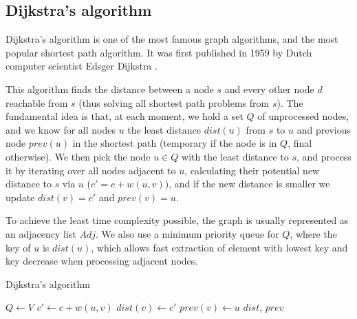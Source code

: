 \subsection{Dijkstra's algorithm} \label{algorithm-shortestpath-dijkstra}
Dijkstra's algorithm is one of the most famous graph algorithms, and the most popular shortest path algorithm. It was first published in 1959 by Dutch computer scientist Edsger Dijkstra \cite{dijkstra}.\par
This algorithm finds the distance between a node $s$ and every other node $d$ reachable from $s$ (thus solving all shortest path problems from $s$). The fundamental idea is that, at each moment, we hold a set $Q$ of unprocessed nodes, and we know for all nodes $u$ the least distance $dist(u)$ from $s$ to $u$ and previous node $prev(u)$ in the shortest path (temporary if the node is in $Q$, final otherwise). We then pick the node $u \in Q$ with the least distance to $s$, and process it by iterating over all nodes adjacent to $u$, calculating their potential new distance to $s$ via $u$ ($c'=c+w(u,v)$), and if the new distance is smaller we update $dist(v)=c'$ and $prev(v)=u$.\par
To achieve the least time complexity possible, the graph is usually represented as an adjacency list $Adj$. We also use a minimum priority queue for $Q$, where the key of $u$ is $dist(u)$, which allows fast extraction of element with lowest key and key decrease when processing adjacent nodes.
\begin{algorithm}[H]
    \caption{Dijkstra's algorithm}
    \label{alg-dijkstra}
    \begin{algorithmic}[1]
             
            \EndFor
            \State $Q \gets V$
             
                    \State $c' \gets c + w(u, v)$
                        \State $dist(v) \gets c'$
                        \State $prev(v) \gets u$
                    \EndIf
                \EndFor
            \EndWhile
            \State \Return $dist$, $prev$
        \EndFunction
    \end{algorithmic}
\end{algorithm}
